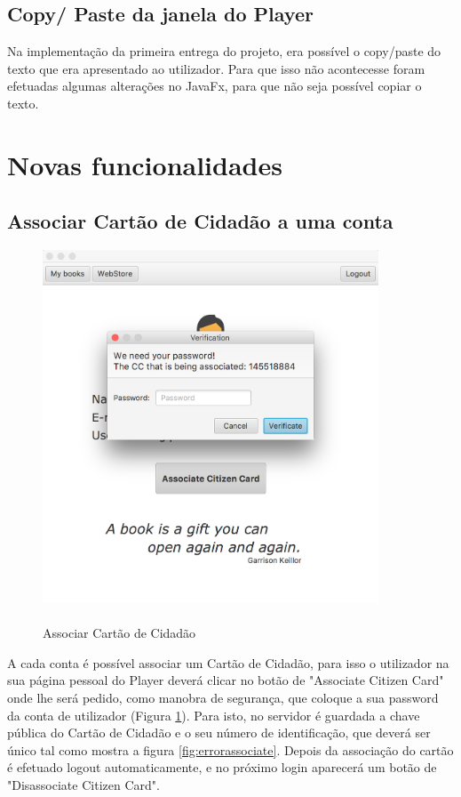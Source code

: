 \documentclass[pdftex,12pt,a4paper]{report}
\begin{document}
\subsection{Copy/ Paste da janela do Player}
Na implementação da primeira entrega do projeto, era possível o copy/paste do texto que era apresentado ao utilizador. Para que isso não acontecesse foram efetuadas algumas alterações no JavaFx, para que não seja possível copiar o texto.

\newpage
\section{Novas funcionalidades}
\subsection{Associar Cartão de Cidadão a uma conta}

\begin{figure}[!htb]
\center
 \includegraphics[width=100mm,scale=1]{Associate.png}
 \caption{\\Associar Cartão de Cidadão}
 \label{fig:associate}
\end{figure}

A cada conta é possível associar um Cartão de Cidadão, para isso o utilizador na sua página pessoal do Player deverá clicar no botão de "Associate Citizen Card" onde lhe será pedido, como manobra de segurança, que coloque a sua password da conta de utilizador (Figura  \ref{fig:associate}). Para isto, no servidor é guardada a chave pública do Cartão de Cidadão e o seu número de identificação, que deverá ser único tal como mostra a figura \ref{fig:errorassociate}. Depois da associação do cartão é efetuado logout automaticamente, e no próximo login aparecerá um botão de "Disassociate Citizen Card".
\end{document}
